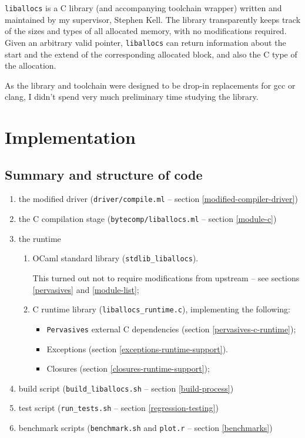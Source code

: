 \documentclass[12pt,a4paper,twoside,openright]{report}
\begin{document}
\lstinline!liballocs! is a C library (and accompanying toolchain wrapper)
written and maintained by my supervisor, Stephen Kell. The library transparently
keeps track of the sizes and types of all allocated memory, with no
modifications required. Given an arbitrary valid pointer, \lstinline!liballocs!
can return information about the start and the extend of the corresponding
allocated block, and also the C type of the allocation.

As the library and toolchain were designed to be drop-in replacements for gcc or
clang, I didn't spend very much preliminary time studying the library.

\chapter{Implementation}

\section{Summary and structure of code}

\begin{enumerate}
  \item the modified driver (\lstinline!driver/compile.ml! -- section \ref{modified-compiler-driver})
  \item the C compilation stage (\lstinline!bytecomp/liballocs.ml! -- section \ref{module-c})
  \item the runtime
    \begin{enumerate}
      \item OCaml standard library (\lstinline!stdlib_liballocs!).

        This turned out not to require modifications from upstream -- see sections \ref{pervasives} and \ref{module-list};
      \item C runtime library (\lstinline!liballocs_runtime.c!), implementing the following:
        \begin{itemize}
          \item \lstinline!Pervasives! external C dependencies (section \ref{pervasives-c-runtime});
          \item Exceptions (section \ref{exceptions-runtime-support}).
          \item Closures (section \ref{closures-runtime-support});
        \end{itemize}
    \end{enumerate}
  \item build script (\lstinline!build_liballocs.sh! -- section \ref{build-process})
  \item test script (\lstinline!run_tests.sh! -- section \ref{regression-testing})
  \item benchmark scripts (\lstinline!benchmark.sh! and \lstinline!plot.r! -- section \ref{benchmarks})
\end{enumerate}
\end{document}
